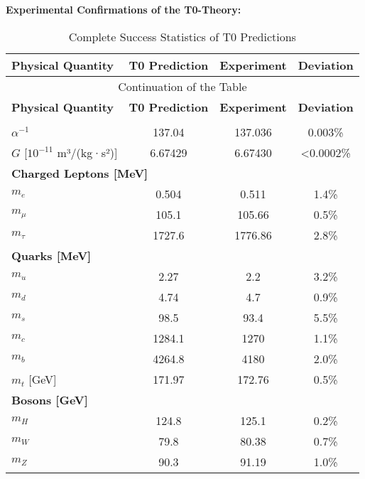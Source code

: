 \documentclass[12pt,a4paper]{article}
\begin{document}
	\begin{achievement}
		\textbf{Experimental Confirmations of the T0-Theory:}
		
		\begin{center}
			\begin{longtable}{lccc}
				\caption{Complete Success Statistics of T0 Predictions} \\
				\toprule
				\textbf{Physical Quantity} & \textbf{T0 Prediction} & \textbf{Experiment} & \textbf{Deviation} \\
				\midrule
				\endfirsthead
				\multicolumn{4}{c}{Continuation of the Table} \\
				\toprule
				\textbf{Physical Quantity} & \textbf{T0 Prediction} & \textbf{Experiment} & \textbf{Deviation} \\
				\midrule
				\endhead
				\bottomrule
				\endlastfoot
				
				\multicolumn{4}{l}{\textbf{Fundamental Constants}} \\
				\midrule
				$\alpha^{-1}$ & 137.04 & 137.036 & 0.003\% \\
				$G$ [$10^{-11}$ m³/(kg·s²)] & 6.67429 & 6.67430 & <0.0002\% \\
				\midrule
				
				\multicolumn{4}{l}{\textbf{Charged Leptons [MeV]}} \\
				\midrule
				$m_e$ & 0.504 & 0.511 & 1.4\% \\
				$m_\mu$ & 105.1 & 105.66 & 0.5\% \\
				$m_\tau$ & 1727.6 & 1776.86 & 2.8\% \\
				\midrule
				
				\multicolumn{4}{l}{\textbf{Quarks [MeV]}} \\
				\midrule
				$m_u$ & 2.27 & 2.2 & 3.2\% \\
				$m_d$ & 4.74 & 4.7 & 0.9\% \\
				$m_s$ & 98.5 & 93.4 & 5.5\% \\
				$m_c$ & 1284.1 & 1270 & 1.1\% \\
				$m_b$ & 4264.8 & 4180 & 2.0\% \\
				$m_t$ [GeV] & 171.97 & 172.76 & 0.5\% \\
				\midrule
				
				\multicolumn{4}{l}{\textbf{Bosons [GeV]}} \\
				\midrule
				$m_H$ & 124.8 & 125.1 & 0.2\% \\
				$m_W$ & 79.8 & 80.38 & 0.7\% \\
				$m_Z$ & 90.3 & 91.19 & 1.0\% \\
				\midrule
				

\end{longtable}
\end{center}
\end{achievement}
\end{document}
